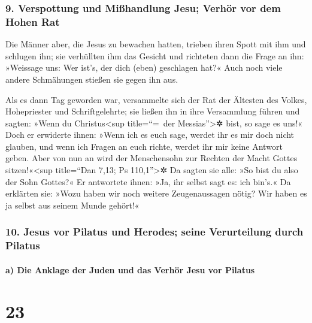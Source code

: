 \hypertarget{verspottung-und-miuxdfhandlung-jesu-verhuxf6r-vor-dem-hohen-rat}{%
\subsubsection{9. Verspottung und Mißhandlung Jesu; Verhör vor dem Hohen
Rat}\label{verspottung-und-miuxdfhandlung-jesu-verhuxf6r-vor-dem-hohen-rat}}

 Die Männer aber, die Jesus zu bewachen hatten, trieben
ihren Spott mit ihm und schlugen ihn;  sie verhüllten ihm
das Gesicht und richteten dann die Frage an ihn: »Weissage uns: Wer
ist's, der dich (eben) geschlagen hat?«  Auch noch viele
andere Schmähungen stießen sie gegen ihn aus.

 Als es dann Tag geworden war, versammelte sich der Rat
der Ältesten des Volkes, Hohepriester und Schriftgelehrte; sie ließen
ihn in ihre Versammlung führen  und sagten: »Wenn du
Christus\textless sup title=``=~der Messias''\textgreater✲ bist, so sage
es uns!« Doch er erwiderte ihnen: »Wenn ich es euch sage, werdet ihr es
mir doch nicht glauben,  und wenn ich Fragen an euch
richte, werdet ihr mir keine Antwort geben.  Aber von nun
an wird der Menschensohn zur Rechten der Macht Gottes
sitzen!«\textless sup title=``Dan 7,13; Ps 110,1''\textgreater✲
 Da sagten sie alle: »So bist du also der Sohn Gottes?«
Er antwortete ihnen: »Ja, ihr selbst sagt es: ich bin's.«
 Da erklärten sie: »Wozu haben wir noch weitere
Zeugenaussagen nötig? Wir haben es ja selbst aus seinem Munde gehört!«

\hypertarget{jesus-vor-pilatus-und-herodes-seine-verurteilung-durch-pilatus}{%
\subsubsection{10. Jesus vor Pilatus und Herodes; seine Verurteilung
durch
Pilatus}\label{jesus-vor-pilatus-und-herodes-seine-verurteilung-durch-pilatus}}

\hypertarget{a-die-anklage-der-juden-und-das-verhuxf6r-jesu-vor-pilatus}{%
\paragraph{a) Die Anklage der Juden und das Verhör Jesu vor
Pilatus}\label{a-die-anklage-der-juden-und-das-verhuxf6r-jesu-vor-pilatus}}

\hypertarget{section-22}{%
\section{23}\label{section-22}}

